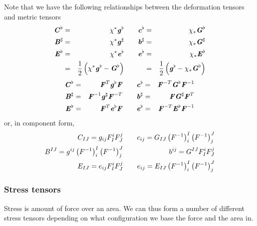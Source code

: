 Note that we have the following relationships between the deformation tensors
and metric tensors
\begin{alignat}{7}
  \boldsymbol{\mathit{C}}^{\flat}&=& \chi^{*}\boldsymbol{\mathit{g}}^{\flat}  &\quad&
  \boldsymbol{\mathit{c}}^{\flat}&=& \chi_{*}\boldsymbol{\mathit{G}}^{\flat}  \\
   \boldsymbol{\mathit{B}}^{\sharp} &=& \chi^{*} \boldsymbol{\mathit{g}}^{\sharp}   &\quad&
   \boldsymbol{\mathit{b}}^{\sharp} &=& \chi_{*} \boldsymbol{\mathit{G}}^{\sharp}   \\
  \boldsymbol{\mathit{E}}^{\flat}&=& \chi^{*}\boldsymbol{\mathit{e}}^{\flat}  &\quad&
  \boldsymbol{\mathit{e}}^{\flat}&=& \chi_{*}\boldsymbol{\mathit{E}}^{\flat}  \\ 
  &=&\frac{1}{2}\left(  \chi^{*}\boldsymbol{\mathit{g}}^{\flat} -\boldsymbol{\mathit{G}}^{\flat} \right)&\quad&
  &=&\frac{1}{2}\left( \boldsymbol{\mathit{g}}^{\flat}- \chi_{*}\boldsymbol{\mathit{G}}^{\flat}  \right)
\end{alignat}
\ie
\begin{alignat}{7}
  \boldsymbol{\mathit{C}}^{\flat}&=&{\boldsymbol{\mathit{F}}}^{T}\boldsymbol{\mathit{g}}^{\flat}\boldsymbol{\mathit{F}} &\quad&
  \boldsymbol{\mathit{c}}^{\flat}&=& {\boldsymbol{\mathit{F}}}^{-T} \boldsymbol{\mathit{G}}^{\flat}{\boldsymbol{\mathit{F}}}^{-1} \\
   \boldsymbol{\mathit{B}}^{\sharp} &=&{\boldsymbol{\mathit{F}}}^{-1} \boldsymbol{\mathit{g}}^{\sharp}  {\boldsymbol{\mathit{F}}}^{-T}  &\quad&
   \boldsymbol{\mathit{b}}^{\sharp} &=&\boldsymbol{\mathit{F}} \boldsymbol{\mathit{G}}^{\sharp} {\boldsymbol{\mathit{F}}}^{T} \\
  \boldsymbol{\mathit{E}}^{\flat}&=&{\boldsymbol{\mathit{F}}}^{T}\boldsymbol{\mathit{e}}^{\flat}\boldsymbol{\mathit{F}} &\quad&
  \boldsymbol{\mathit{e}}^{\flat}&=& {\boldsymbol{\mathit{F}}}^{-T} \boldsymbol{\mathit{E}}^{\flat}{\boldsymbol{\mathit{F}}}^{-1}   
\end{alignat}
or, in component form,
\begin{alignat}{3}
  C_{IJ}=g_{ij}F^{i}_{I}F^{j}_{J} &\quad& 
  c_{ij}=G_{IJ}\left( {F}^{-1} \right)^{I}_{i}\left( {F}^{-1} \right)^{J}_{j} \\
  B^{IJ}=g^{ij}\left( {F}^{-1} \right)^{I}_{i}\left( {F}^{-1} \right)^{J}_{j} &\quad&
  b^{ij}=G^{IJ}F^{i}_{I}F^{j}_{J} \\
  E_{IJ}=e_{ij}F^{i}_{I}F^{j}_{J} &\quad&
  e_{ij}=E_{IJ}\left( {F}^{-1} \right)^{I}_{i}\left( {F}^{-1} \right)^{J}_{j}   
\end{alignat}

\subsubsection{Stress tensors}

Stress is amount of force over an area. We can thus form a number of different
stress tensors depending on what configuration we base the force and the area
in.

